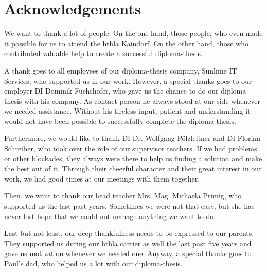 \chapter*{Acknowledgements}
We want to thank a lot of people. On the one hand, those people, who even made it possible for us to attend the \gls{htbla} Kaindorf. On the other hand, those who contributed valuable help to create a successful diploma-thesis.

A thank goes to all employees of our diploma-thesis company, Sunlime IT Services, who supported us in our work. However, a special thanks goes to our employer DI Dominik Fuchshofer, who gave us the chance to do our diploma-thesis with his company. As contact person he always stood at our side whenever we needed assistance. Without his tireless input, patient and understanding it would not have been possible to successfully complete the diploma-thesis.

Furthermore, we would like to thank DI Dr. Wolfgang Pölzleitner and DI Florian Schreiber, who took over the role of our supervisor teachers. If we had problems or other blockades, they always were there to help us finding a solution and make the best out of it. Through their cheerful character and their great interest in our work, we had good times at our meetings with them together.

Then, we want to thank our head teacher Mrs. Mag. Michaela Primig, who supported us the last past years. Sometimes we were not that easy, but she has never lost hope that we could not manage anything we want to do.

Last but not least, our deep thankfulness needs to be expressed to our parents. They supported us during our \gls{htbla} carrier as well the last past five years and gave us motivation whenever we needed one. Anyway, a special thanks goes to Paul’s dad, who helped us a lot with our diploma-thesis.
